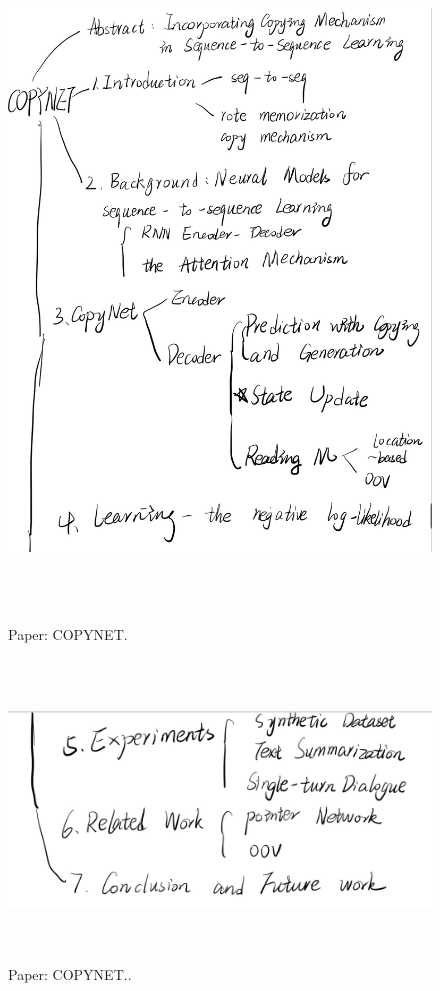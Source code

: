 \documentclass[UTF8]{ctexart}
\begin{document}
    \begin{figure}[htbp]
        \centering
        \vspace{-0.35cm} 
        \includegraphics[width=14cm,height=18cm]{pictures/a1.jpg}
        \caption{Paper: COPYNET.}
    \end{figure}


    \begin{figure}[htbp]
        \centering
        \vspace{-0.35cm} 
        \includegraphics[width=14cm,height=8cm]{pictures/a2.jpg}
        \caption{Paper: COPYNET..}
    \end{figure}
\end{document}
